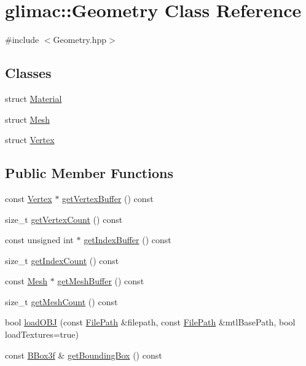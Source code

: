 \hypertarget{classglimac_1_1_geometry}{}\section{glimac\+:\+:Geometry Class Reference}
\label{classglimac_1_1_geometry}


{\ttfamily \#include $<$Geometry.\+hpp$>$}

\subsection*{Classes}
\begin{DoxyCompactItemize}
\item 
struct \hyperlink{structglimac_1_1_geometry_1_1_material}{Material}
\item 
struct \hyperlink{structglimac_1_1_geometry_1_1_mesh}{Mesh}
\item 
struct \hyperlink{structglimac_1_1_geometry_1_1_vertex}{Vertex}
\end{DoxyCompactItemize}
\subsection*{Public Member Functions}
\begin{DoxyCompactItemize}
\item 
const \hyperlink{structglimac_1_1_geometry_1_1_vertex}{Vertex} $\ast$ \hyperlink{classglimac_1_1_geometry_add889566d1d4d2fea740d84cf5e3c18f}{get\+Vertex\+Buffer} () const
\item 
size\+\_\+t \hyperlink{classglimac_1_1_geometry_adf2d769d9b6195c2ab88f6dfe6abd8d9}{get\+Vertex\+Count} () const
\item 
const unsigned int $\ast$ \hyperlink{classglimac_1_1_geometry_a26b9a7ccfd6a574284fb054821ed6bbd}{get\+Index\+Buffer} () const
\item 
size\+\_\+t \hyperlink{classglimac_1_1_geometry_aaadc2607a96a09f9fdc36190809e915b}{get\+Index\+Count} () const
\item 
const \hyperlink{structglimac_1_1_geometry_1_1_mesh}{Mesh} $\ast$ \hyperlink{classglimac_1_1_geometry_ae86a5f63f1e2770ddc110412761aa98a}{get\+Mesh\+Buffer} () const
\item 
size\+\_\+t \hyperlink{classglimac_1_1_geometry_ab57f1169fb19e5a02866d2f36308dd91}{get\+Mesh\+Count} () const
\item 
bool \hyperlink{classglimac_1_1_geometry_af796a2bd4c60c32de47b3bcb53bb3cef}{load\+O\+BJ} (const \hyperlink{classglimac_1_1_file_path}{File\+Path} \&filepath, const \hyperlink{classglimac_1_1_file_path}{File\+Path} \&mtl\+Base\+Path, bool load\+Textures=true)
\item 
const \hyperlink{structglimac_1_1_b_box3f}{B\+Box3f} \& \hyperlink{classglimac_1_1_geometry_aa91aac0c120e51e59e192a518e790311}{get\+Bounding\+Box} () const
\end{DoxyCompactItemize}



